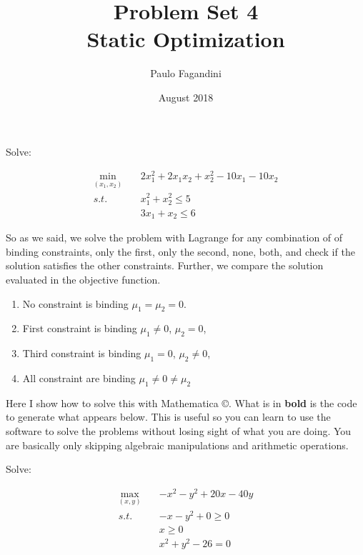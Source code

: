 \documentclass[answers]{exam}
\title{Problem Set 4\\ Static Optimization}
\author{Paulo Fagandini}
\date{August 2018}
\begin{document}
\maketitle

\begin{questions}



\question Solve:

\begin{align*}
    \min_{(x_1,x_2)}\quad & 2x_1^2+2x_1x_2+x_2^2-10x_1-10x_2\\
    s.t.\quad & x_1^2+x_2^2\leq5\\
    & 3x_1+x_2\leq 6
\end{align*}

\begin{solution}
So as we said, we solve the problem with Lagrange for any combination of of binding constraints, only the first, only the second, none, both, and check if the solution satisfies the other constraints. Further, we compare the solution evaluated in the objective function.

\begin{enumerate}
    \item No constraint is binding $\mu_1=\mu_2=0$.
    
    \item First constraint is binding $\mu_1\neq0$, $\mu_2=0$,
    
    \item Third constraint is binding $\mu_1=0$, $\mu_2\neq 0$,
    
    \item All constraint are binding $\mu_1\neq0\neq\mu_2$
\end{enumerate}

Here I show how to solve this with Mathematica \copyright. What is in \textbf{bold} is the code to generate what appears below. This is useful so you can learn to use the software to solve the problems without losing sight of what you are doing. You are basically only skipping algebraic manipulations and arithmetic operations.



\end{solution}

\question Solve:

\begin{align*}
    \max_{(x,y)}\quad & -x^2-y^2+20x-40y\\
    s.t.\quad & -x-y^2+0\geq 0\\
    & x\geq 0\\
    &x^2+y^2-26=0
\end{align*}


\end{questions}
\end{document}
